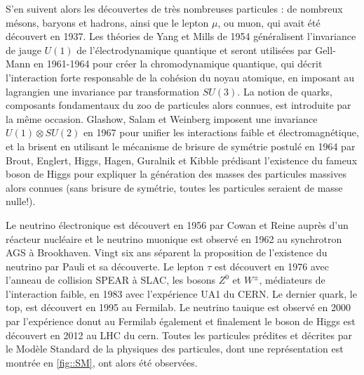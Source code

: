       S'en suivent alors les découvertes de très nombreuses particules : de nombreux mésons, baryons et  hadrons, ainsi que le lepton $\mu$, ou muon, qui avait été découvert en 1937\cite{Street1937}. Les théories de Yang et Mills de 1954\cite{Yang1954} généralisent l'invariance de jauge $U(1)$ de l'électrodynamique quantique et seront utilisées par Gell-Mann en 1961-1964\cite{Glashow1961,Gell-Mann1964} pour créer la chromodynamique quantique, qui décrit l'interaction forte responsable de la cohésion du noyau atomique, en imposant au lagrangien une invariance par transformation $SU(3)$. La notion de quarks, composants fondamentaux du zoo de particules alors connues, est introduite par la même occasion. Glashow, Salam et Weinberg imposent une invariance $U(1)\otimes SU(2)$ en 1967\cite{Glashow1961a,Salam1964,Weinberg1967} pour unifier les interactions faible et électromagnétique, et la brisent en utilisant le mécanisme de brisure de symétrie postulé en 1964 par  Brout, Englert, Higgs, Hagen, Guralnik et Kibble\cite{Englert1964,Higgs1964,Higgs1964a,Kibble1967} prédisant l'existence du fameux boson de Higgs pour expliquer la génération des masses des particules massives alors connues (sans brisure de symétrie, toutes les particules seraient de masse nulle!). 

      Le neutrino électronique est découvert en 1956 par Cowan et Reine\cite{Cowan1956} auprès d'un réacteur nucléaire et le neutrino muonique est observé en 1962\cite{Danby1962} au synchrotron AGS à Brookhaven. Vingt six ans séparent la proposition de l'existence du neutrino par Pauli et sa découverte. Le lepton $\tau$ est découvert en 1976\cite{Perl1975} avec l'anneau de collision SPEAR à SLAC, les bosons $Z^0$ et $W^{\pm}$, médiateurs de l'interaction faible, en 1983\cite{Arnison1983,Arnison1983a} avec l'expérience UA1 du CERN. Le dernier quark, le top, est découvert en 1995\cite{Collaboration1995} au Fermilab. Le neutrino tauique est observé en 2000 par l'expérience \gls{donut}\cite{Collaboration2000} au Fermilab également et finalement le boson de Higgs est découvert en 2012 au LHC du \gls{cern}\cite{Collaboration2012}. Toutes les particules prédites et décrites par le Modèle Standard de la physiques des particules, dont une représentation est montrée en \autoref{fig::SM}, ont alors été observées. 

